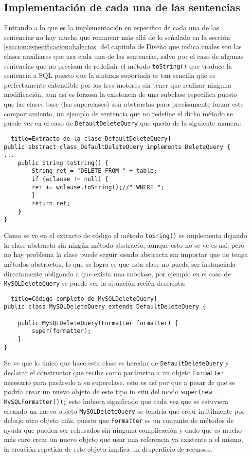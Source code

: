 \subsection{Implementación de cada una de las sentencias}
%
Entrando a lo que es la implementación en especifico de cada una de las sentencias no hay mucho que remarcar más allá de lo señalado en la sección \ref{seccion:especificacion:dialectos} del capitulo de Diseño que indica cuales son las clases auxiliares que usa cada una de las sentencias, salvo por el caso de algunas sentencias que no precisan de redefinir el método \verb=toString()= que traduce la sentencia a SQL puesto que la sintaxis soportada es tan sencilla que es perfectamente entendible por los tres motores sin tener que realizar ninguna modificación, aun así es forzosa la existencia de una subclase especifica puesto que las clases base (las superclases) son abstractas para precisamente forzar este comportamiento, un ejemplo de sentencia que no redefine el dicho método se puede ver en el caso de \verb=DefaultDeleteQuery= que quedo de la siguiente manera:
%
\begin{lstlisting} [title=Extracto de la clase DefaultDeleteQuery]
public abstract class DefaultDeleteQuery implements DeleteQuery {
...
	public String toString() {
		String ret = "DELETE FROM " + table;
		if (wclause != null) {
		ret += wclause.toString();//" WHERE ";
		}
		return ret;
	}
}
\end{lstlisting}
%
Como se ve en el extracto de código el método \verb=toSring()= se implementa dejando la clase abstracta sin ningún método abstracto, aunque esto no se ve es así, pero no hay problema la clase puede seguir siendo abstracta sin importar que no tenga métodos abstractos, lo que se logra es que esta clase no pueda ser instanciada directamente obligando a que exista una subclase, por ejemplo en el caso de \verb=MySQLDeleteQuery= se puede ver la situación recién descripta:
%
\begin{lstlisting} [title=Código completo de MySQLDeleteQuery]
public class MySQLDeleteQuery extends DefaultDeleteQuery {

	public MySQLDeleteQuery(Formatter formatter) {
		super(formatter);
	}
}
\end{lstlisting}
%

Se ve que lo único que hace esta clase es heredar de \verb=DefaultDeleteQuery= y declarar el constructor que recibe como parámetro a un objeto \verb=Formatter= necesario para pasárselo a su superclase, esto es así por que a pesar de que se podría crear un nuevo objeto de este tipo in situ del modo \verb=super(new MySQLFormatter());= esto hubiera significado que cada vez que se estuviera creando un nuevo objeto \verb=MySQLDeleteQuery= se tendría que crear inútilmente por debajo otro objeto más, puesto que \verb=Formatter= es un conjunto de métodos de ayuda que pueden ser rehusados sin ninguna complicación y dado que es mucho más caro crear un nuevo objeto que usar una referencia ya existente a el mismo, la creación repetida de este objeto implica un desperdicio de recursos.

